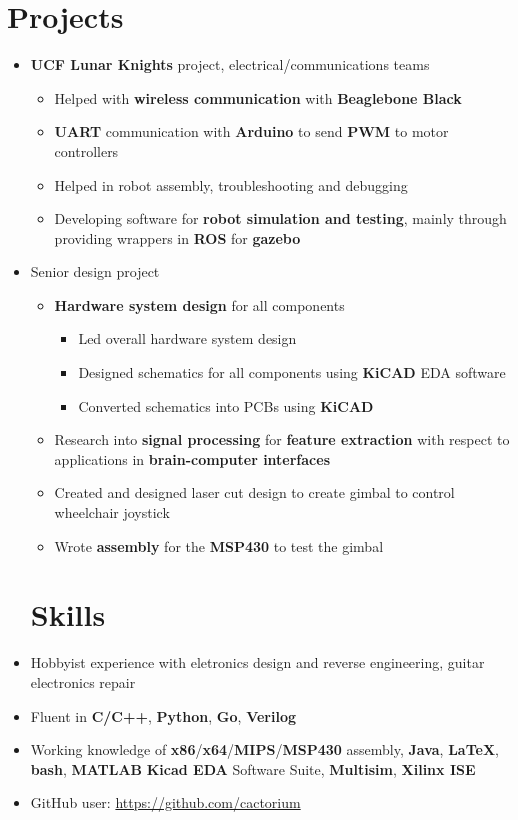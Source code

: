 \documentclass{my_resume}
\begin{document}
\section{Projects}
\begin{itemize}
    \item \textbf{UCF Lunar Knights} project, electrical/communications teams
        \begin{itemize}
            \item Helped with \textbf{wireless communication} with
                \textbf{Beaglebone Black}
            \item \textbf{UART} communication with \textbf{Arduino} to send
                \textbf{PWM} to motor controllers
            \item Helped in robot assembly, troubleshooting and debugging
            \item Developing software for \textbf{robot simulation and testing}, mainly through providing wrappers
              in \textbf{ROS} for \textbf{gazebo}
        \end{itemize}
    \item Senior design project
        \begin{itemize}
            \item \textbf{Hardware system design} for all components
            \begin{itemize}
                \item Led overall hardware system design
                \item Designed schematics for all components using \textbf{KiCAD} EDA software
                \item Converted schematics into PCBs using \textbf{KiCAD}
            \end{itemize}
            \item Research into \textbf{signal processing} for \textbf{feature extraction}
                with respect to applications in \textbf{brain-computer interfaces}
            \item Created and designed laser cut design to create gimbal to control wheelchair joystick
            \item Wrote \textbf{assembly} for the \textbf{MSP430} to test the gimbal
        \end{itemize}
\section{Skills}
    \item Hobbyist experience with eletronics design and reverse engineering, guitar electronics
        repair
    \item Fluent in \textbf{C/C++}, \textbf{Python}, \textbf{Go}, \textbf{Verilog}
	\item Working knowledge of \textbf{x86}/\textbf{x64}/\textbf{MIPS}/\textbf{MSP430} assembly,
            \textbf{Java}, \textbf{LaTeX}, \textbf{bash}, \textbf{MATLAB}
            \textbf{Kicad EDA} Software Suite, \textbf{Multisim}, \textbf{Xilinx ISE}
    \item GitHub user: \url{https://github.com/cactorium}
\end{itemize}
\end{document}
